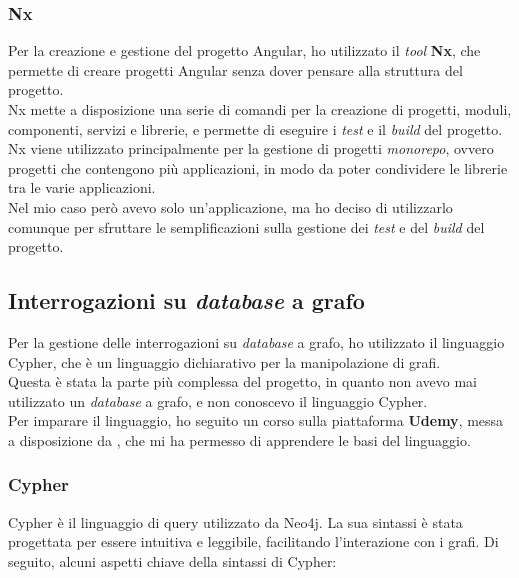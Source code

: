 \subsubsection*{Nx}
Per la creazione e gestione del progetto Angular, ho utilizzato il \textit{tool} \textbf{Nx}, 
che permette di creare progetti Angular senza dover pensare alla struttura del progetto.\\
Nx mette a disposizione una serie di comandi per la creazione di progetti, moduli, componenti, servizi e librerie,
e permette di eseguire i \textit{test} e il \textit{build} del progetto.\\
Nx viene utilizzato principalmente per la gestione di progetti \textit{monorepo}, ovvero progetti che contengono più applicazioni,
in modo da poter condividere le librerie tra le varie applicazioni.\\
Nel mio caso però avevo solo un'applicazione, ma ho deciso di utilizzarlo comunque per sfruttare le semplificazioni sulla gestione 
dei \textit{test} e del \textit{build} del progetto.\\

\subsection*{Interrogazioni su \textit{database} a grafo}
Per la gestione delle interrogazioni su \textit{database} a grafo, ho utilizzato il linguaggio Cypher,
che è un linguaggio dichiarativo per la manipolazione di grafi.\\
Questa è stata la parte più complessa del progetto, in quanto non avevo mai utilizzato un \textit{database} a grafo,
e non conoscevo il linguaggio Cypher.\\
Per imparare il linguaggio, ho seguito un corso sulla piattaforma \textbf{Udemy}, messa a disposizione da \azienda{},
che mi ha permesso di apprendere le basi del linguaggio.\\

\subsubsection*{Cypher}
Cypher è il linguaggio di query utilizzato da Neo4j. La sua sintassi è stata progettata per essere intuitiva e leggibile, 
facilitando l'interazione con i grafi. Di seguito, alcuni aspetti chiave della sintassi di Cypher:

